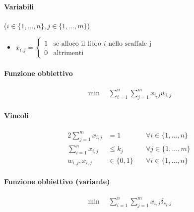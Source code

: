 \documentclass{article}
\begin{document}
\paragraph{Variabili} ($i \in \{1,\ldots,n\}, j \in \{1,\ldots,m\}$)
\begin{itemize}
  \item $x_{i,j} = \begin{cases}
    1 &\text{se alloco il libro }i\text{ nello scaffale j}\\
    0 &\text{altrimenti}
  \end{cases}$
\end{itemize}

\paragraph{Funzione obbiettivo}
\begin{align*}
  \min \quad \sum_{i=1}^n \sum_{j=1}^m x_{i,j} w_{i,j}
\end{align*}

\paragraph{Vincoli}
\begin{alignat}{2}
  \sum_{j=1}^m x_{i,j} &= 1 &\forall i \in \{1,\ldots,n\}\\
  \sum_{i=1}^n x_{i,j} &\leq k_j &\forall j \in \{1,\ldots,m\}\\
  w_{i,j}, x_{i,j} &\in \{0,1\} \quad &\forall i \in \{1,\ldots,n\}
\end{alignat}

\paragraph{Funzione obbiettivo (variante)}
\begin{align*}
  \min \quad \sum_{i=1}^n \sum_{j=1}^m x_{i,j} \delta_{s_i,j}
\end{align*}
\end{document}
